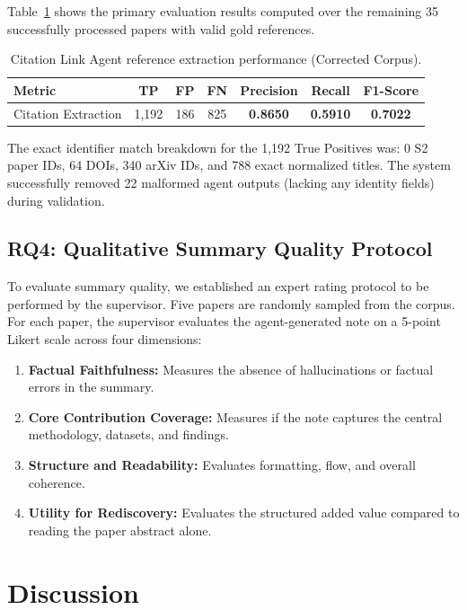 \documentclass[runningheads]{llncs}
\begin{document}
Table~\ref{tab:rq3_results} shows the primary evaluation results computed over the remaining 35 successfully processed papers with valid gold references.

\begin{table}[h]
\centering
\caption{Citation Link Agent reference extraction performance (Corrected Corpus).}
\label{tab:rq3_results}
\begin{tabular}{lcccccc}
\toprule
\textbf{Metric} & \textbf{TP} & \textbf{FP} & \textbf{FN} & \textbf{Precision} & \textbf{Recall} & \textbf{F1-Score} \\
\midrule
Citation Extraction & 1,192 & 186 & 825 & \textbf{0.8650} & \textbf{0.5910} & \textbf{0.7022} \\
\bottomrule
\end{tabular}
\end{table}

The exact identifier match breakdown for the 1,192 True Positives was: 0 S2 paper IDs, 64 DOIs, 340 arXiv IDs, and 788 exact normalized titles. The system successfully removed 22 malformed agent outputs (lacking any identity fields) during validation.

\subsection{RQ4: Qualitative Summary Quality Protocol}
To evaluate summary quality, we established an expert rating protocol to be performed by the supervisor. Five papers are randomly sampled from the corpus. For each paper, the supervisor evaluates the agent-generated note on a 5-point Likert scale across four dimensions:
\begin{enumerate}
    \item \textbf{Factual Faithfulness:} Measures the absence of hallucinations or factual errors in the summary.
    \item \textbf{Core Contribution Coverage:} Measures if the note captures the central methodology, datasets, and findings.
    \item \textbf{Structure and Readability:} Evaluates formatting, flow, and overall coherence.
    \item \textbf{Utility for Rediscovery:} Evaluates the structured added value compared to reading the paper abstract alone.
\end{enumerate}

\section{Discussion}
\label{sec:discussion}
\end{document}
